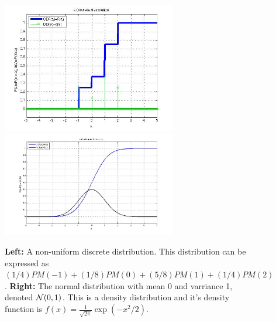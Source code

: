 \begin{figure}[b]
\begin{center}
\includegraphics[width=3in]{figs/Discrete2.jpg}
\includegraphics[width=3in]{figs/Normal.jpg}
\end{center}
\caption{{\bf Left:} A non-uniform discrete distribution. This
  distribution can be expressed as
  $(1/4)PM(-1)+(1/8)PM(0)+(5/8)PM(1)+(1/4)PM(2)$. {\bf Right:} The
  normal distribution with mean $0$ and varriance 1, denoted ${\cal
  N}(0,1)$. This is a density distribution and it's density function
is $f(x) = \frac{1}{\sqrt{2\pi}} \exp(-x^2/2)$.}
\end{figure}

